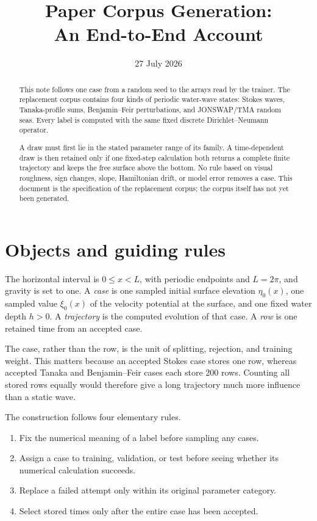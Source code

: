 \documentclass[10pt]{article}
\title{Paper Corpus Generation:\\
An End-to-End Account}
\author{}
\date{27 July 2026}
\begin{document}
\maketitle

\begin{abstract}
This note follows one case from a random seed to the arrays read by the
trainer.  The replacement corpus contains four kinds of periodic water-wave
states: Stokes waves, Tanaka-profile sums, Benjamin--Feir perturbations, and
JONSWAP/TMA random seas.  Every label is computed with the same fixed
discrete Dirichlet--Neumann operator.

A draw must first lie in the stated parameter range of its family.  A
time-dependent draw is then retained only if one fixed-step calculation both
returns a complete finite trajectory and keeps the free surface above the
bottom.  No rule based on visual roughness, sign changes, slope, Hamiltonian
drift, or model error removes a case.  This document is the specification of
the replacement corpus; the corpus itself has not yet been generated.
\end{abstract}

\section{Objects and guiding rules}

The horizontal interval is $0\leq x<L$, with periodic endpoints and
$L=2\pi$, and gravity is set to one.  A \emph{case} is one sampled initial
surface elevation $\eta_0(x)$, one sampled value $\xi_0(x)$ of the velocity
potential at the surface, and one fixed water depth $h>0$.  A
\emph{trajectory} is the computed evolution of that case.  A \emph{row} is
one retained time from an accepted case.

The case, rather than the row, is the unit of splitting, rejection, and
training weight.  This matters because an accepted Stokes case stores one
row, whereas accepted Tanaka and Benjamin--Feir cases each store 200 rows.
Counting all stored rows equally would therefore give a long trajectory much
more influence than a static wave.

The construction follows four elementary rules.
\begin{enumerate}
  \item Fix the numerical meaning of a label before sampling any cases.
  \item Assign a case to training, validation, or test before seeing whether
        its numerical calculation succeeds.
  \item Replace a failed attempt only within its original parameter category.
  \item Select stored times only after the entire case has been accepted.
\end{enumerate}
\end{document}
